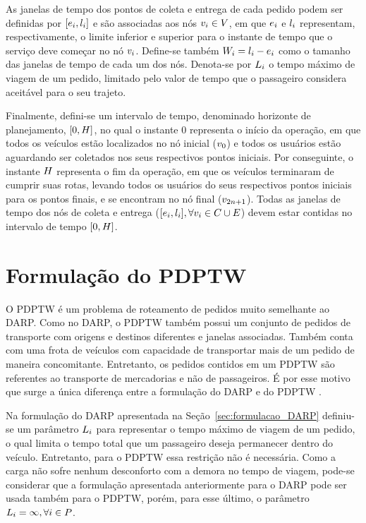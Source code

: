 As janelas de tempo dos pontos de coleta e entrega de cada pedido podem ser
definidas por $[e_{i},l_{i}]$ e são 
associadas aos nós $v_{i} \in V$, em que $e_{i}$ e 
$l_{i}$ representam, respectivamente, o limite inferior e 
superior para o instante de tempo que o serviço deve começar no nó $v_{i}$.
Define-se também $W_{i} = l_{i} 
- e_{i}$ como o tamanho das janelas de tempo 
de cada um dos nós. Denota-se por $L_i$ o tempo máximo de 
viagem de um pedido, limitado pelo valor de tempo que o passageiro considera 
aceitável para o seu trajeto. 

Finalmente, defini-se um intervalo de tempo, denominado horizonte de
planejamento, $[0, H]$, no qual o instante $0$ representa o 
início da operação, em que todos os veículos estão localizados no nó inicial 
($v_{0}$) e todos os usuários estão aguardando ser coletados nos seus 
respectivos pontos iniciais.
Por conseguinte, o instante $H$ representa o fim da operação, 
em que os veículos terminaram de cumprir suas rotas, levando todos os usuários 
do seus respectivos pontos iniciais para os pontos finais, e se 
encontram no nó final ($v_{2n + 1}$). Todas as janelas de tempo dos nós de
coleta e entrega ($[e_i, l_i], 
\forall v_{i} \in C \cup E$) devem estar contidas 
no intervalo de tempo $[0, H]$.

\section{Formulação do PDPTW}\label{sec:formulacao_PDPTW}

O PDPTW é um problema de roteamento de pedidos muito semelhante ao DARP.
Como no DARP, o PDPTW também possui um conjunto de pedidos de transporte com
origens e destinos diferentes e janelas associadas.
Também conta com uma frota de veículos com capacidade de transportar mais de um
pedido de maneira concomitante.
Entretanto, os pedidos contidos em um PDPTW são referentes ao transporte de
mercadorias e não de passageiros.
É por esse motivo que surge a única diferença entre a formulação do DARP e do
PDPTW \cite{parragh_survey_2008}.

Na formulação do DARP apresentada na Seção~\ref{sec:formulacao_DARP} definiu-se
um parâmetro $L_i$ para representar o tempo máximo de viagem
de um pedido, o qual limita o tempo total que um passageiro deseja permanecer
dentro do veículo.
Entretanto, para o PDPTW essa restrição não é necessária. Como a carga não
sofre nenhum desconforto com a demora no tempo de viagem, pode-se considerar 
que a formulação apresentada anteriormente para o DARP pode ser usada também 
para o PDPTW, porém, para esse último, o parâmetro 
$L_i = \infty, \forall i \in P$.

